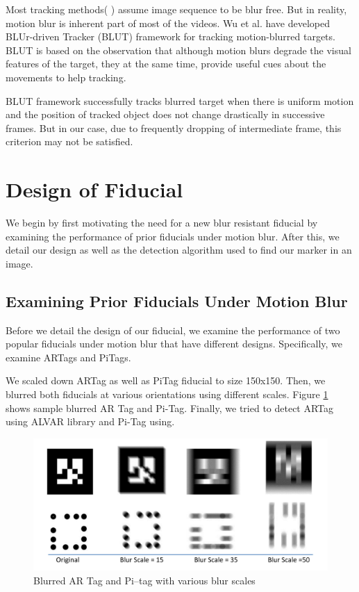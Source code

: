 \documentclass[runningheads]{llncs}
\begin{document}
Most tracking methods( \cite{Ross:2008} \cite{Wu:2009} \cite{Perez02}
\cite{Mei:2009} ) assume image sequence to be blur free. But in reality, motion
blur is inherent part of most of the videos. Wu et al.\cite{Wu:2011} have
developed BLUr-driven Tracker (BLUT) framework for tracking motion-blurred
targets. BLUT is based on the observation that although motion blurs degrade
the visual features of the target, they at the same time, provide useful cues
about the movements to help tracking.

BLUT framework successfully tracks blurred target when there is uniform motion
and the position of tracked object does not change drastically in successive
frames. But in our case, due to frequently dropping of intermediate frame, this
criterion may not be satisfied.

\section{Design of Fiducial}

We begin by first motivating the need for a new blur resistant fiducial by examining
the performance of prior fiducials under motion blur.  After this, we detail
our design as well as the detection algorithm used to find our marker in an image.

\subsection{Examining Prior Fiducials Under Motion Blur}

Before we detail the design of our fiducial, we examine the performance of two
popular fiducials under motion blur that have different designs. Specifically,
we examine ARTags\cite{Fiala05} and PiTags\cite{Pitag13}.

We scaled down ARTag as well as PiTag fiducial to size 150x150.  Then, we
blurred both fiducials at various orientations using different scales.
Figure \ref{fig:artag_pitag} shows sample blurred AR Tag and Pi-Tag. Finally, we
tried to detect ARTag using ALVAR library\cite{alvar} and Pi-Tag using\cite{ros_pitag}.

\begin{figure}
\centering
\includegraphics[width=\linewidth]{artag_pitag.pdf}
\caption{Blurred AR Tag and Pi--tag with various blur scales}
\label{fig:artag_pitag}
\end{figure}
\end{document}
